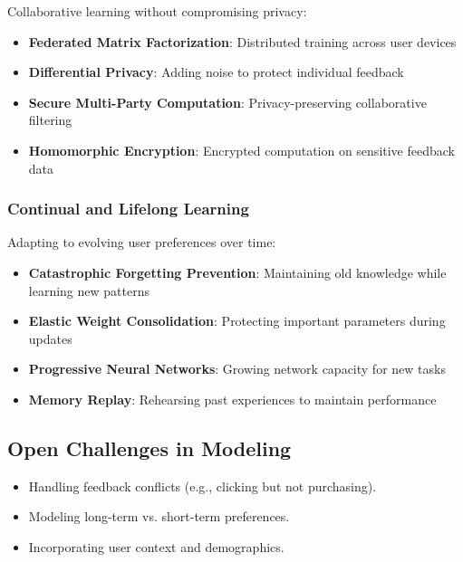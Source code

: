 Collaborative learning without compromising privacy:

\begin{itemize}
    \item \textbf{Federated Matrix Factorization}: Distributed training across user devices
    \item \textbf{Differential Privacy}: Adding noise to protect individual feedback
    \item \textbf{Secure Multi-Party Computation}: Privacy-preserving collaborative filtering
    \item \textbf{Homomorphic Encryption}: Encrypted computation on sensitive feedback data
\end{itemize}

\subsubsection{Continual and Lifelong Learning}

Adapting to evolving user preferences over time:

\begin{itemize}
    \item \textbf{Catastrophic Forgetting Prevention}: Maintaining old knowledge while learning new patterns
    \item \textbf{Elastic Weight Consolidation}: Protecting important parameters during updates
    \item \textbf{Progressive Neural Networks}: Growing network capacity for new tasks
    \item \textbf{Memory Replay}: Rehearsing past experiences to maintain performance
\end{itemize}

\subsection{Open Challenges in Modeling}

\begin{itemize}
    \item Handling feedback conflicts (e.g., clicking but not purchasing).
    \item Modeling long-term vs. short-term preferences.
    \item Incorporating user context and demographics.
\end{itemize}
